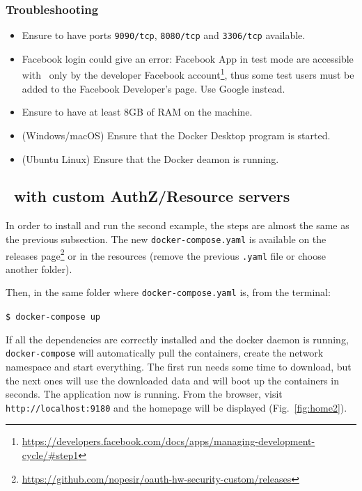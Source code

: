 \subsubsection{Troubleshooting}
\begin{itemize}
    \item Ensure to have ports \texttt{9090/tcp}, \texttt{8080/tcp} and \texttt{3306/tcp} available.
    \item Facebook login could give an error: Facebook App in test mode are accessible with \oauth\ only by the developer Facebook account\footnote{\url{https://developers.facebook.com/docs/apps/managing-development-cycle/\#step1}}, thus some test users must be added to the Facebook Developer's page. Use Google instead.
    \item Ensure to have at least 8GB of RAM on the machine.
    \item (Windows/macOS) Ensure that the Docker Desktop program is started.
    \item (Ubuntu Linux) Ensure that the Docker deamon is running.
\end{itemize}

\subsection{\oauth\ with custom AuthZ/Resource servers}
In order to install and run the second example, the steps are almost the same as the previous subsection. The new \texttt{docker-compose.yaml} is available on the releases page\footnote{\url{https://github.com/nopesir/oauth-hw-security-custom/releases}} or in the resources (remove the previous \texttt{.yaml} file or choose another folder).

\noindent Then, in the same folder where \texttt{docker-compose.yaml} is, from the terminal:

  \texttt{\$ docker-compose up}

\noindent If all the dependencies are correctly installed and the docker daemon is running, \texttt{docker-compose} will automatically pull the containers, create the network namespace and start everything. 
The first run needs some time to download, but the next ones will use the downloaded data and will boot up the containers in seconds. The application now is running. From the browser, visit \texttt{http://localhost:9180} and the homepage will be displayed (Fig.~\ref{fig:home2}).

